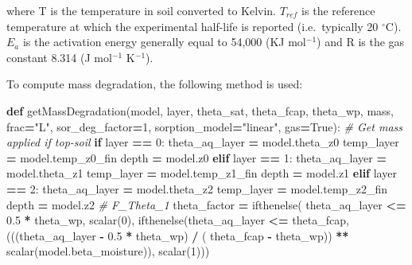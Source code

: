 \documentclass[]{article}
\newenvironment{Shaded}{\begin{snugshade}}{\end{snugshade}}
\newcommand{\KeywordTok}[1]{\textcolor[rgb]{0.13,0.29,0.53}{\textbf{#1}}}
\newcommand{\DecValTok}[1]{\textcolor[rgb]{0.00,0.00,0.81}{#1}}
\newcommand{\FloatTok}[1]{\textcolor[rgb]{0.00,0.00,0.81}{#1}}
\newcommand{\StringTok}[1]{\textcolor[rgb]{0.31,0.60,0.02}{#1}}
\newcommand{\CommentTok}[1]{\textcolor[rgb]{0.56,0.35,0.01}{\textit{#1}}}
\newcommand{\VariableTok}[1]{\textcolor[rgb]{0.00,0.00,0.00}{#1}}
\newcommand{\ControlFlowTok}[1]{\textcolor[rgb]{0.13,0.29,0.53}{\textbf{#1}}}
\newcommand{\OperatorTok}[1]{\textcolor[rgb]{0.81,0.36,0.00}{\textbf{#1}}}
\newcommand{\NormalTok}[1]{#1}
\begin{document}
where T is the temperature in soil converted to Kelvin. \(T_{ref}\) is
the reference temperature at which the experimental half-life is
reported (i.e.~typically 20 \(^{\circ}\)C). \(E_a\) is the activation
energy generally equal to 54,000 (KJ mol\(^{-1}\)) and R is the gas
constant 8.314 (J mol\(^{-1}\) K\(^{-1}\)).

To compute mass degradation, the following method is used:

\begin{Shaded}
\begin{Highlighting}[]
\KeywordTok{def}\NormalTok{ getMassDegradation(model, layer,}
\NormalTok{                       theta_sat, theta_fcap, theta_wp,}
\NormalTok{                       mass, frac}\OperatorTok{=}\StringTok{"L"}\NormalTok{, sor_deg_factor}\OperatorTok{=}\DecValTok{1}\NormalTok{,}
\NormalTok{                       sorption_model}\OperatorTok{=}\StringTok{"linear"}\NormalTok{, gas}\OperatorTok{=}\VariableTok{True}\NormalTok{):}
    \CommentTok{# Get mass applied if top-soil}
    \ControlFlowTok{if}\NormalTok{ layer }\OperatorTok{==} \DecValTok{0}\NormalTok{:}
\NormalTok{        theta_aq_layer }\OperatorTok{=}\NormalTok{ model.theta_z0}
\NormalTok{        temp_layer }\OperatorTok{=}\NormalTok{ model.temp_z0_fin}
\NormalTok{        depth }\OperatorTok{=}\NormalTok{ model.z0}
    \ControlFlowTok{elif}\NormalTok{ layer }\OperatorTok{==} \DecValTok{1}\NormalTok{:}
\NormalTok{        theta_aq_layer }\OperatorTok{=}\NormalTok{ model.theta_z1}
\NormalTok{        temp_layer }\OperatorTok{=}\NormalTok{ model.temp_z1_fin}
\NormalTok{        depth }\OperatorTok{=}\NormalTok{ model.z1}
    \ControlFlowTok{elif}\NormalTok{ layer }\OperatorTok{==} \DecValTok{2}\NormalTok{:}
\NormalTok{        theta_aq_layer }\OperatorTok{=}\NormalTok{ model.theta_z2}
\NormalTok{        temp_layer }\OperatorTok{=}\NormalTok{ model.temp_z2_fin}
\NormalTok{        depth }\OperatorTok{=}\NormalTok{ model.z2}
    \CommentTok{# F_Theta_1}
\NormalTok{    theta_factor }\OperatorTok{=}\NormalTok{ ifthenelse(}
\NormalTok{        theta_aq_layer }\OperatorTok{<=} \FloatTok{0.5} \OperatorTok{*}\NormalTok{ theta_wp, scalar(}\DecValTok{0}\NormalTok{),}
\NormalTok{        ifthenelse(theta_aq_layer }\OperatorTok{<=}\NormalTok{ theta_fcap,}
\NormalTok{                   (((theta_aq_layer }\OperatorTok{-} \FloatTok{0.5} \OperatorTok{*}\NormalTok{ theta_wp) }\OperatorTok{/}\NormalTok{ (}
\NormalTok{                       theta_fcap }\OperatorTok{-}\NormalTok{ theta_wp)) }\OperatorTok{**}\NormalTok{ scalar(model.beta_moisture)),}
\NormalTok{                   scalar(}\DecValTok{1}\NormalTok{)))}

\end{Highlighting}
\end{Shaded}
\end{document}
